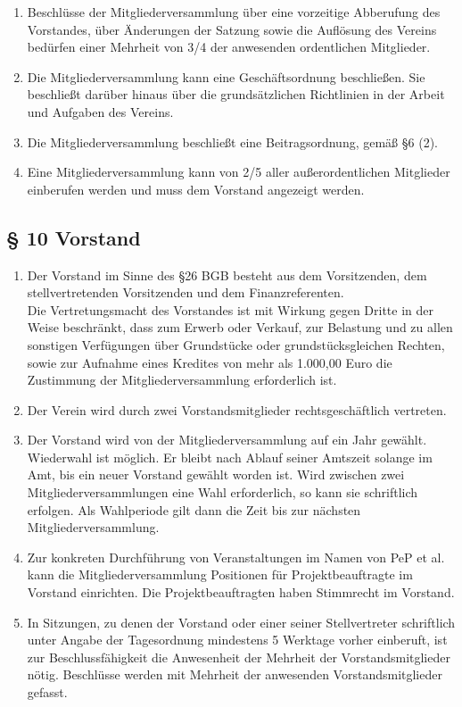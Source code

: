 \documentclass[fontsize=12pt, paper=a4, DIV14, parskip]{scrreprt}
\begin{document}
\begin{enumerate}[\qquad(1)]
	\item Beschlüsse der Mitgliederversammlung über eine vorzeitige Abberufung des Vorstandes, über Änderungen der Satzung sowie die Auflösung des Vereins bedürfen einer Mehrheit von 3/4 der anwesenden ordentlichen Mitglieder.
	\item Die Mitgliederversammlung kann eine Geschäftsordnung beschließen. Sie beschließt darüber hinaus über die grundsätzlichen Richtlinien in der Arbeit und Aufgaben des Vereins.
	\item Die Mitgliederversammlung beschließt eine Beitragsordnung, gemäß §6 (2).
	\item Eine Mitgliederversammlung kann von 2/5 aller außerordentlichen Mitglieder einberufen werden und muss dem Vorstand angezeigt werden.
\end{enumerate}

\subsection{\S{} 10 Vorstand}

\begin{enumerate}[\qquad(1)]
	\item Der Vorstand im Sinne des §26 BGB besteht aus dem Vorsitzenden, dem stellvertretenden Vorsitzenden und dem Finanzreferenten.\\
		Die Vertretungsmacht des Vorstandes ist mit Wirkung gegen Dritte in der Weise beschränkt, dass zum Erwerb oder Verkauf, zur Belastung und zu allen sonstigen Verfügungen über Grundstücke oder grundstücksgleichen Rechten, sowie zur Aufnahme eines Kredites von mehr als 1.000,00 Euro die Zustimmung der Mitgliederversammlung erforderlich ist.
	\item Der Verein wird durch zwei Vorstandsmitglieder rechtsgeschäftlich vertreten.
	\item Der Vorstand wird von der Mitgliederversammlung auf ein Jahr gewählt. Wiederwahl ist möglich. Er bleibt nach Ablauf seiner Amtszeit solange im Amt, bis ein neuer Vorstand gewählt worden ist. Wird zwischen zwei Mitgliederversammlungen eine Wahl erforderlich, so kann sie schriftlich erfolgen. Als Wahlperiode gilt dann die Zeit bis zur nächsten Mitgliederversammlung.
	\item Zur konkreten Durchführung von Veranstaltungen im Namen von \glqq PeP et al.\grqq$\,$kann die Mitgliederversammlung Positionen für Projektbeauftragte im Vorstand einrichten. Die Projektbeauftragten haben Stimmrecht im Vorstand.
	\item In Sitzungen, zu denen der Vorstand oder einer seiner Stellvertreter schriftlich unter Angabe der Tagesordnung mindestens 5 Werktage vorher einberuft, ist zur Beschlussfähigkeit die Anwesenheit der Mehrheit der Vorstandsmitglieder nötig. Beschlüsse werden mit Mehrheit der anwesenden Vorstandsmitglieder gefasst.
\end{enumerate}
\end{document}
